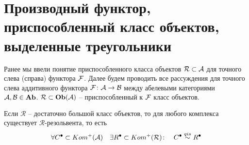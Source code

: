 \documentclass[../main.tex]{subfiles}
\begin{document}
\section{Производный функтор, приспособленный класс объектов, выделенные треугольники }
Ранее мы ввели понятие приспособленного класса объектов $\mathcal{R}\subset \mathcal{A}$ для точного слева (справа) функтора $\mathcal{F}$. Далее будем проводить все рассуждения для точного слева аддитивного функтора $\mathcal{F}\colon \mathcal{A} \to \mathcal{B}$ между абелевыми категориями $\mathcal{A}, \mathcal{B} \in \mathbf{Ab}$. $\mathcal{R}\subset \mathbf{Ob}(\mathcal{A})$ -- приспособленный к $\mathcal{F}$ класс объектов.
\begin{to_claim}
 Если $\mathcal{R}$ -- достаточно большой класс объектов, то для любого комплекса существует $\mathcal{R}$-резольвента, то есть
 \[
 \forall C^\bullet \subset Kom^{+}(\mathcal{A}) \quad \exists R^\bullet \subset Kom^+(\mathcal{R}) \colon \quad C^\bullet \overset{qis}{\sim} R^\bullet
 \]
\end{to_claim}
\end{document}
